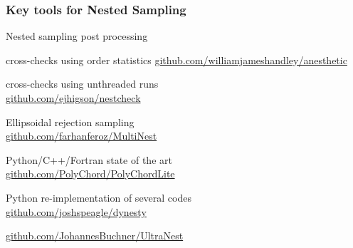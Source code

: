 \documentclass[aspectratio=169,handout]{beamer}
\begin{document}
\begin{frame}
    \frametitle{Key tools for Nested Sampling}
    \begin{description}
        \item[\texttt{anesthetic}] Nested sampling post processing \\
        \item[\texttt{insertion}] cross-checks using order statistics 
            \hspace{5pt}\url{github.com/williamjameshandley/anesthetic}
        \item[\texttt{nestcheck}] cross-checks using unthreaded runs \\
            \hspace{5pt}\url{github.com/ejhigson/nestcheck}
        \item[\texttt{MultiNest}] Ellipsoidal rejection sampling \\
            \hspace{5pt}\url{github.com/farhanferoz/MultiNest}
        \item[\texttt{PolyChord}] Python/C++/Fortran state of the art \\
            \hspace{5pt}\url{github.com/PolyChord/PolyChordLite} 
        \item[\texttt{dynesty}] Python re-implementation of several codes \\
            \hspace{5pt}\url{github.com/joshspeagle/dynesty}
        \item[\& \texttt{UltraNest}] \hspace{5pt}\url{github.com/JohannesBuchner/UltraNest}
    \end{description}
\end{frame}
\end{document}
